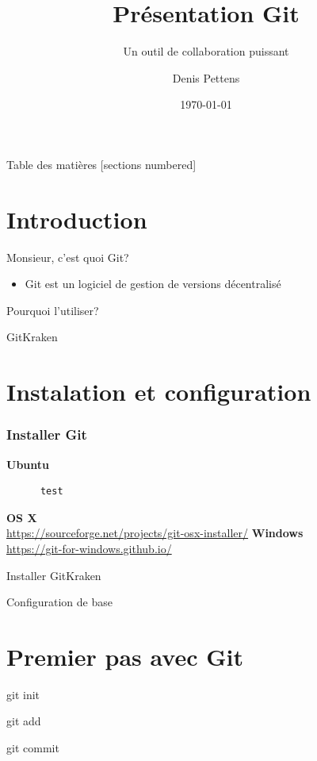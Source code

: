 \documentclass{beamer}
\title{Présentation Git}
\subtitle{Un outil de collaboration puissant}
\date{\today}
\author{Denis Pettens}
\institute{Louvain-li-Nux}
\begin{document}
  \maketitle

  \begin{frame}{Table des matières}
      [sections numbered]
      \tableofcontents[hideallsubsections]
  \end{frame}

  \section{Introduction}
  \begin{frame}{Monsieur, c'est quoi Git?}
      \begin{itemize}
          \item Git est un logiciel de gestion de versions décentralisé
      \end{itemize}
  \end{frame}
  \begin{frame}{Pourquoi l'utiliser?}

  \end{frame}
  \begin{frame}{GitKraken}

  \end{frame}
  \section{Instalation et configuration}
\begin{frame}[fragile]
     \frametitle{Installer Git}
      \textbf{Ubuntu}\\
      \begin{lstlisting}
      test
      \end{lstlisting}
      \textbf{OS X}\\
          \url{https://sourceforge.net/projects/git-osx-installer/}
      \textbf{Windows}\\
          \url{https://git-for-windows.github.io/}
\end{frame}
  \begin{frame}{Installer GitKraken}

  \end{frame}
  \begin{frame}{Configuration de base}

  \end{frame}
  \section{Premier pas avec Git}
  \begin{frame}{git init}

  \end{frame}
  \begin{frame}{git add}

  \end{frame}
  \begin{frame}{git commit}

  \end{frame}
\end{document}
